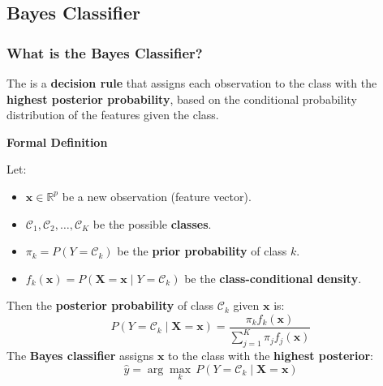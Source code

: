 \subsection{Bayes Classifier}

\subsubsection{What is the Bayes Classifier?}

The  is a \textbf{decision rule} that assigns each observation to the class with the \textbf{highest posterior probability}, based on the conditional probability distribution of the features given the class.

\highspace
\begin{flushleft}
    \textcolor{Green3}{ \textbf{Formal Definition}}
\end{flushleft}
Let:
\begin{itemize}
    \item $\mathbf{x} \in \mathbb{R}^p$ be a new observation (feature vector).
    \item $\mathcal{C}_1, \mathcal{C}_2, \dots, \mathcal{C}_K$ be the possible \textbf{classes}.
    \item $\pi_k = P\left(Y = \mathcal{C}_k\right)$ be the \textbf{prior probability} of class $k$.
    \item $f_k(\mathbf{x}) = P\left(\mathbf{X} = \mathbf{x} \mid Y = \mathcal{C}_k\right)$ be the \textbf{class-conditional density}.
\end{itemize}
Then the \textbf{posterior probability} of class $\mathcal{C}_k$ given $\mathbf{x}$ is:
\begin{equation}
    P\left(Y = \mathcal{C}_k \mid \mathbf{X} = \mathbf{x}\right) = \dfrac{\pi_{k} f_{k}\left(\mathbf{x}\right)}{\displaystyle\sum_{j=1}^{K} \pi_{j} f_{j}\left(\mathbf{x}\right)}
\end{equation}
The \textbf{Bayes classifier} assigns $\mathbf{x}$ to the class with the \textbf{highest posterior}:
\begin{equation}
    \hat{y} = \arg\max_k \, P\left(Y = \mathcal{C}_k \mid \mathbf{X} = \mathbf{x}\right)
\end{equation}

